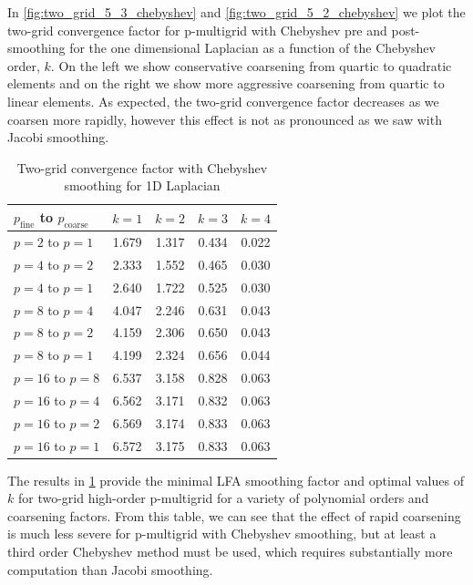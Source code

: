 \documentclass[review]{siamart190516}
\begin{document}
In \cref{fig:two_grid_5_3_chebyshev} and \cref{fig:two_grid_5_2_chebyshev} we plot the two-grid convergence factor for p-multigrid with Chebyshev pre and post-smoothing for the one dimensional Laplacian as a function of the Chebyshev order, $k$.
On the left we show conservative coarsening from quartic to quadratic elements and on the right we show more aggressive coarsening from quartic to linear elements.
As expected, the two-grid convergence factor decreases as we coarsen more rapidly, however this effect is not as pronounced as we saw with Jacobi smoothing.

\begin{table}[ht!]
\begin{center}
\begin{tabular}{l c c c c}
  \toprule
  $p_{\text{fine}}$ to $p_{\text{coarse}}$  &  $k = 1$   &  $k = 2$   &  $k = 3$   &  $k = 4$   \\
  \toprule
  $p = 2$ to $p = 1$   &  1.679  &  1.317  &  0.434  &  0.022  \\
  \midrule
  $p = 4$ to $p = 2$   &  2.333  &  1.552  &  0.465  &  0.030  \\
  $p = 4$ to $p = 1$   &  2.640  &  1.722  &  0.525  &  0.030  \\
  \midrule
  $p = 8$ to $p = 4$   &  4.047  &  2.246  &  0.631  &  0.043  \\
  $p = 8$ to $p = 2$   &  4.159  &  2.306  &  0.650  &  0.043  \\
  $p = 8$ to $p = 1$   &  4.199  &  2.324  &  0.656  &  0.044  \\
  \midrule
  $p = 16$ to $p = 8$  &  6.537  &  3.158  &  0.828  &  0.063  \\
  $p = 16$ to $p = 4$  &  6.562  &  3.171  &  0.832  &  0.063  \\
  $p = 16$ to $p = 2$  &  6.569  &  3.174  &  0.833  &  0.063  \\
  $p = 16$ to $p = 1$  &  6.572  &  3.175  &  0.833  &  0.063  \\
  \bottomrule
\end{tabular}
\end{center}
\caption{Two-grid convergence factor with Chebyshev smoothing for 1D Laplacian}
\label{table:two_grid_1d_chebyshev}
\end{table}

The results in \cref{table:two_grid_1d_chebyshev} provide the minimal LFA smoothing factor and optimal values of $k$ for two-grid high-order p-multigrid for a variety of polynomial orders and coarsening factors.
From this table, we can see that the effect of rapid coarsening is much less severe for p-multigrid with Chebyshev smoothing, but at least a third order Chebyshev method must be used, which requires substantially more computation than Jacobi smoothing.
\end{document}
